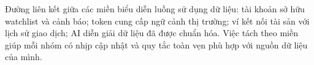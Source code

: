 Đường liên kết giữa các miền biểu diễn luồng sử dụng dữ liệu: tài khoản sở hữu watchlist và cảnh báo; token cung cấp ngữ cảnh thị trường; ví kết nối tài sản với lịch sử giao dịch; AI diễn giải dữ liệu đã được chuẩn hóa. Việc tách theo miền giúp mỗi nhóm có nhịp cập nhật và quy tắc toàn vẹn phù hợp với nguồn dữ liệu của mình.
